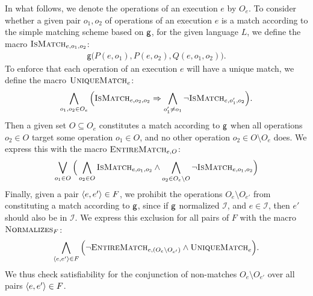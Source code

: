 In what follows, we denote the operations of an execution $e$ by $O_e$.
To consider whether a given pair $o_1, o_2$ of operations of an execution $e$
is a match according to the simple matching scheme based on ${\sf g}$, for
the given language $L$, we define the macro $\textsc{IsMatch}_{e,o_1,o_2}$:
\begin{align*}
  \mathsf{g}\big( P(e,o_1), P(e,o_2), Q(e,o_1,o_2) \big).
\end{align*}
To enforce that each operation of an execution $e$ will have a unique match,
we define the macro $\textsc{UniqueMatch}_e$:
\begin{align*}
  \bigwedge_{o_1,o_2 \in O_e} \Big(
    \textsc{IsMatch}_{e,o_2,o_2} \implies
    \bigwedge_{o_1' \neq o_1} \lnot \textsc{IsMatch}_{e,o_1',o_2}
  \Big).
\end{align*}
Then a given set $O \subseteq O_e$ constitutes a match according to
${\sf g}$ when all operations $o_2 \in O$ target some operation $o_1 \in O$,
and no other operation $o_2 \in O \setminus O_e$ does. We express this with the
macro $\textsc{EntireMatch}_{e,O}$:
\begin{align*}
  \bigvee_{o_1 \in O}
  \Big(
  \bigwedge_{o_2 \in O} \textsc{IsMatch}_{e,o_1,o_2}
  \land \bigwedge_{o_2 \in O_e \setminus O} \lnot \textsc{IsMatch}_{e,o_1,o_2}
  \Big)
\end{align*}
Finally, given a pair $\tup{e,e'} \in F$, we prohibit the operations $O_e
\setminus O_{e'}$ from constituting a match according to ${\sf g}$, since if
${\sf g}$ normalized $\mathcal{I}$, and $e \in \mathcal{I}$, then $e'$ should
also be in $\mathcal{I}$. We express this exclusion for all pairs of $F$
with the macro $\textsc{Normalizes}_{F}$:
\begin{align*}
  \bigwedge_{\tup{e,e'}\in F} \Big(
    \lnot \textsc{EntireMatch}_{e,(O_e \setminus O_{e'})}
    \land \textsc{UniqueMatch}_{e}
  \Big).
\end{align*}
We thus check satisfiability for the conjunction of non-matches $O_e \setminus
O_{e'}$ over all pairs $\tup{e,e'} \in F$.


